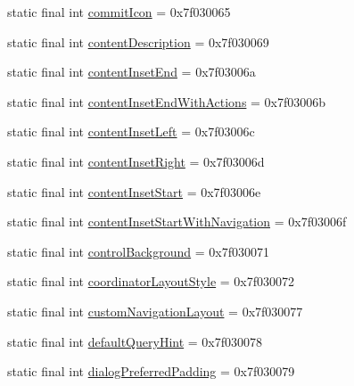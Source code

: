 \begin{DoxyCompactItemize}
\item 
static final int \mbox{\hyperlink{classandroid_1_1support_1_1v7_1_1appcompat_1_1_r_1_1attr_a1a5044030cb1f7d3843a4e16d8e9fac9}{commit\+Icon}} = 0x7f030065
\item 
static final int \mbox{\hyperlink{classandroid_1_1support_1_1v7_1_1appcompat_1_1_r_1_1attr_a8c6272d54d135cbf5546e2a0234f15f8}{content\+Description}} = 0x7f030069
\item 
static final int \mbox{\hyperlink{classandroid_1_1support_1_1v7_1_1appcompat_1_1_r_1_1attr_ab71363df2b03d4f30e3d536a00a2ca6d}{content\+Inset\+End}} = 0x7f03006a
\item 
static final int \mbox{\hyperlink{classandroid_1_1support_1_1v7_1_1appcompat_1_1_r_1_1attr_a8bc41dc209147c932fd433349fd68696}{content\+Inset\+End\+With\+Actions}} = 0x7f03006b
\item 
static final int \mbox{\hyperlink{classandroid_1_1support_1_1v7_1_1appcompat_1_1_r_1_1attr_aaf2a29e66c8a42789b673d462773925e}{content\+Inset\+Left}} = 0x7f03006c
\item 
static final int \mbox{\hyperlink{classandroid_1_1support_1_1v7_1_1appcompat_1_1_r_1_1attr_a94b4a9274ac6846ced1bf48134b9d949}{content\+Inset\+Right}} = 0x7f03006d
\item 
static final int \mbox{\hyperlink{classandroid_1_1support_1_1v7_1_1appcompat_1_1_r_1_1attr_a61dc3ecd604789f327e116a47a14eb48}{content\+Inset\+Start}} = 0x7f03006e
\item 
static final int \mbox{\hyperlink{classandroid_1_1support_1_1v7_1_1appcompat_1_1_r_1_1attr_aec0ee8896f70725491d6040521980ec9}{content\+Inset\+Start\+With\+Navigation}} = 0x7f03006f
\item 
static final int \mbox{\hyperlink{classandroid_1_1support_1_1v7_1_1appcompat_1_1_r_1_1attr_a45487fed6103ea5d91fe539fb516567f}{control\+Background}} = 0x7f030071
\item 
static final int \mbox{\hyperlink{classandroid_1_1support_1_1v7_1_1appcompat_1_1_r_1_1attr_aa118571a086de74470e780299f0fdcd4}{coordinator\+Layout\+Style}} = 0x7f030072
\item 
static final int \mbox{\hyperlink{classandroid_1_1support_1_1v7_1_1appcompat_1_1_r_1_1attr_ab2e6c054c8f5ae06a6e87cc02953c64c}{custom\+Navigation\+Layout}} = 0x7f030077
\item 
static final int \mbox{\hyperlink{classandroid_1_1support_1_1v7_1_1appcompat_1_1_r_1_1attr_ae3cf4d27d2e9b11002adc082eb60c299}{default\+Query\+Hint}} = 0x7f030078
\item 
static final int \mbox{\hyperlink{classandroid_1_1support_1_1v7_1_1appcompat_1_1_r_1_1attr_ad396f5e8162c9e55d0327928cc7fa536}{dialog\+Preferred\+Padding}} = 0x7f030079

\end{DoxyCompactItemize}
